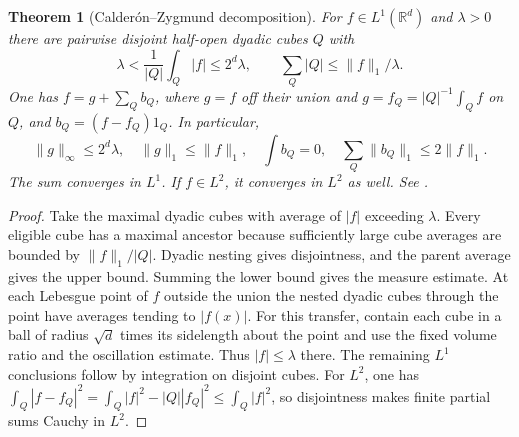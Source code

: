 \documentclass[11pt,oneside,openany]{book}
\newtheorem{theorem}{Theorem}[chapter]
\theoremstyle{definition}
\theoremstyle{remark}
\begin{document}
\begin{theorem}[Calder\'on--Zygmund decomposition]
\label{p102:U2-02}
For \(f\in L^1(\mathbb R^d)\) and \(\lambda>0\) there are pairwise disjoint half-open dyadic cubes \(Q\) with
\[
 \lambda<\frac{1}{|Q|}\int_Q|f|\le2^d\lambda,\qquad
 \sum_Q|Q|\le\|f\|_1/\lambda .
\]
One has \(f=g+\sum_Q b_Q\), where \(g=f\) off their union and \(g=f_Q=|Q|^{-1}\int_Q f\) on \(Q\), and \(b_Q=(f-f_Q)1_Q\). In particular,
\[
 \|g\|_\infty\le2^d\lambda,\quad \|g\|_1\le\|f\|_1,\quad
 \int b_Q=0,\quad \sum_Q\|b_Q\|_1\le2\|f\|_1.
\]
The sum converges in \(L^1\). If \(f\in L^2\), it converges in \(L^2\) as well. See \cite[\S5.3.1]{grafakos}.
\end{theorem}
\begin{proof}
Take the maximal dyadic cubes with average of \(|f|\) exceeding \(\lambda\). Every eligible cube has a maximal ancestor because sufficiently large cube averages are bounded by \(\|f\|_1/|Q|\). Dyadic nesting gives disjointness, and the parent average gives the upper bound. Summing the lower bound gives the measure estimate. At each Lebesgue point of \(f\) outside the union the nested dyadic cubes through the point have averages tending to \(|f(x)|\). For this transfer, contain each cube in a ball of radius \(\sqrt d\) times its sidelength about the point and use the fixed volume ratio and the oscillation estimate. Thus \(|f|\le\lambda\) there. The remaining \(L^1\) conclusions follow by integration on disjoint cubes. For \(L^2\), one has \(\int_Q|f-f_Q|^2=\int_Q|f|^2-|Q||f_Q|^2\le\int_Q|f|^2\), so disjointness makes finite partial sums Cauchy in \(L^2\).
\end{proof}
\end{document}
